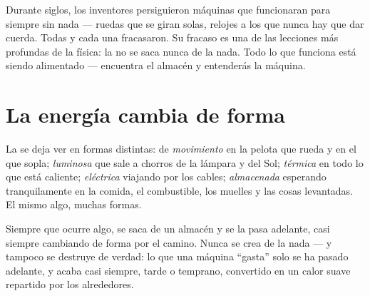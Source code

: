 \begin{remark}\label{rem:g5:everyday-energy:nofree}
Durante siglos, los inventores persiguieron máquinas que funcionaran
para siempre sin nada --- ruedas que se giran solas, relojes a los que
nunca hay que dar cuerda. Todas y cada una fracasaron. Su fracaso es
una de las lecciones más profundas de la física: la  no se
saca nunca de la nada. Todo lo que funciona está siendo alimentado ---
encuentra el almacén y entenderás la máquina.
\end{remark}

\section{La energía cambia de forma}

\begin{example}\label{ex:g5:everyday-energy:forms}
La  se deja ver en formas distintas:  de
\emph{movimiento} en la pelota que rueda y en el  que sopla;
 \emph{luminosa} que sale a chorros de la lámpara y del
Sol;  \emph{térmica} en todo lo que está caliente;
 \emph{eléctrica} viajando por los cables; 
\emph{almacenada} esperando tranquilamente en la comida, el
combustible, los muelles y las cosas levantadas. El mismo algo, muchas
formas.
\end{example}

\begin{proposition}\label{prop:g5:everyday-energy:chain}
Siempre que ocurre algo, se saca  de un almacén y se la pasa
adelante, casi siempre cambiando de forma por el camino. Nunca se crea
de la nada --- y tampoco se destruye de verdad: lo que una máquina
``gasta'' solo se ha pasado adelante, y acaba casi siempre, tarde o
temprano, convertido en un calor suave repartido por los alrededores.
\end{proposition}

